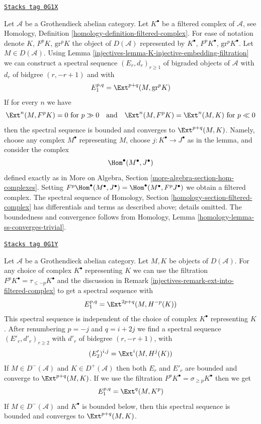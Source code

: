 \begin{remark}
\label{injectives-remark-ext-into-filtered-complex}
\href{https://stacks.math.columbia.edu/tag/0G1X}{\texttt{Stacks tag 0G1X}}

Let $\mathcal{A}$ be a Grothendieck abelian category.
Let $K^\bullet$ be a filtered complex of $\mathcal{A}$, see
Homology, Definition \ref{homology-definition-filtered-complex}.
For ease of notation denote $K$, $F^pK$, $\text{gr}^pK$ the
object of $D(\mathcal{A})$ represented by $K^\bullet$,
$F^pK^\bullet$, $\text{gr}^pK^\bullet$. Let $M \in D(\mathcal{A})$.
Using Lemma \ref{injectives-lemma-K-injective-embedding-filtration}
we can construct a spectral sequence $(E_r, d_r)_{r \geq 1}$
of bigraded objects of $\mathcal{A}$ with $d_r$ of bidgree
$(r, -r + 1)$ and
with
$$
E_1^{p, q} = \Ext^{p + q}(M, \text{gr}^pK)
$$
If for every $n$ we have
$$
\Ext^n(M, F^pK) = 0 \text{ for } p \gg 0
\quad\text{and}\quad
\Ext^n(M, F^pK) = \Ext^n(M, K) \text{ for } p \ll 0
$$
then the spectral sequence is bounded and converges to $\Ext^{p + q}(M, K)$.
Namely, choose any complex $M^\bullet$ representing $M$, choose
$j : K^\bullet \to J^\bullet$ as in the lemma, and consider the complex
$$
\Hom^\bullet(M^\bullet, J^\bullet)
$$
defined exactly as in
More on Algebra, Section \ref{more-algebra-section-hom-complexes}.
Setting $F^p\Hom^\bullet(M^\bullet, J^\bullet) =
\Hom^\bullet(M^\bullet, F^pJ^\bullet)$ we obtain a filtered complex.
The spectral sequence of
Homology, Section \ref{homology-section-filtered-complex}
has differentials and terms as described above; details omitted.
The boundedness and convergence follows from
Homology, Lemma \ref{homology-lemma-ss-converges-trivial}.
\end{remark}

\begin{remark}
\label{injectives-remark-spectral-sequences-ext}
\href{https://stacks.math.columbia.edu/tag/0G1Y}{\texttt{Stacks tag 0G1Y}}

Let $\mathcal{A}$ be a Grothendieck abelian category.
Let $M, K$ be objects of $D(\mathcal{A})$.
For any choice of complex $K^\bullet$ representing $K$ we
can use the filtration $F^pK^\bullet = \tau_{\leq -p}K^\bullet$
and the discussion in Remark \ref{injectives-remark-ext-into-filtered-complex}
to get a spectral sequence with
$$
E_1^{p, q} = \Ext^{2p + q}(M, H^{-p}(K))
$$
This spectral sequence is independent of the choice of
complex $K^\bullet$ representing $K$. After renumbering
$p = -j$ and $q = i + 2j$ we find a spectral sequence
$(E'_r, d'_r)_{r \geq 2}$ with $d'_r$ of bidegree $(r, -r + 1)$, with
$$
(E'_2)^{i, j} = \Ext^i(M, H^j(K))
$$
If $M \in D^-(\mathcal{A})$ and $K \in D^+(\mathcal{A})$ then
both $E_r$ and $E'_r$ are bounded and converge to $\Ext^{p + q}(M, K)$.
If we use the filtration $F^pK^\bullet = \sigma_{\geq p}K^\bullet$
then we get
$$
E_1^{p, q} = \Ext^q(M, K^p)
$$
If $M \in D^-(\mathcal{A})$ and $K^\bullet$ is bounded below, then
this spectral sequence is bounded and converges to $\Ext^{p + q}(M, K)$.
\end{remark}

